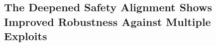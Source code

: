 \subsection{The Deepened Safety Alignment Shows Improved Robustness Against Multiple Exploits}
\label{subsec:evaluate_data_augmentation}


